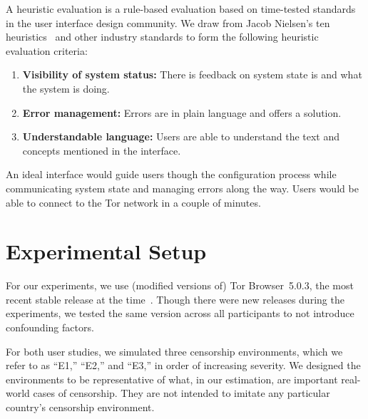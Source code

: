 \documentclass[USenglish,oneside,twocolumn]{article}
\begin{document}
A heuristic evaluation is a rule-based evaluation based on time-tested standards
in the user interface design community. We draw from Jacob Nielsen's ten heuristics~\cite{nielsen1994heuristic}
and other industry standards to form the following heuristic evaluation criteria: \\

\begin{enumerate}
    \item  {\bfseries Visibility of system status:} There is feedback on system state is and what the system is doing. 
    \item  {\bfseries Error management:}  Errors are in plain language and offers a solution. 
    \item  {\bfseries Understandable language:} Users are able to understand the text and concepts mentioned in the interface. 
\end{enumerate}

An ideal interface would guide users though the configuration process while communicating system state and managing errors along the way. Users would be able to connect to the Tor network in a couple of minutes. 

\section{Experimental Setup}
\label{sec:environments}
For our experiments, we use (modified versions of) Tor Browser~5.0.3, 
the most recent stable release at the time~\cite{torbrowser-503}.
Though there were new releases during the experiments,
we tested the same version across all participants to not introduce
confounding factors.

For both user studies, we simulated three censorship environments,
which we refer to as ``E1,'' ``E2,'' and ``E3,'' in order of increasing severity.
We designed the environments to be representative
of what, in our estimation, are important real-world
cases of censorship. They are not intended to imitate
any particular country's censorship environment.

\smallskip
\end{document}
